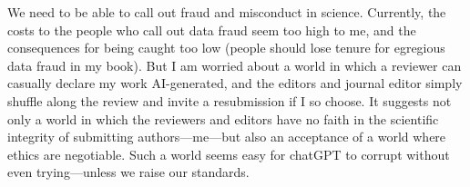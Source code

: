 \documentclass[11pt]{article}
\begin{document}
We need to be able to call out fraud and misconduct in science. Currently, the costs to the people who call out data fraud seem too high to me, and the consequences for being caught too low (people should lose tenure for egregious data fraud in my book). But I am worried about a world in which a reviewer can casually declare my work AI-generated, and the editors and journal editor simply shuffle along the review and invite a resubmission if I so choose. It suggests not only a world in which the reviewers and editors have no faith in the scientific integrity of submitting authors---me---but also an acceptance of a world where ethics are negotiable. Such a world seems easy for chatGPT to corrupt without even trying---unless we raise our standards. 
\end{document}
